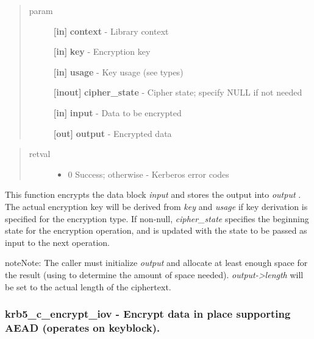 \documentclass[letterpaper,10pt,english]{sphinxmanual}
\begin{document}
\begin{quote}\begin{description}
\item[{param}] \leavevmode
\textbf{{[}in{]}} \textbf{context} - Library context

\textbf{{[}in{]}} \textbf{key} - Encryption key

\textbf{{[}in{]}} \textbf{usage} - Key usage (see  types)

\textbf{{[}inout{]}} \textbf{cipher\_state} - Cipher state; specify NULL if not needed

\textbf{{[}in{]}} \textbf{input} - Data to be encrypted

\textbf{{[}out{]}} \textbf{output} - Encrypted data

\end{description}\end{quote}
\begin{quote}\begin{description}
\item[{retval}] \leavevmode\begin{itemize}
\item {} 
0   Success; otherwise - Kerberos error codes

\end{itemize}

\end{description}\end{quote}

This function encrypts the data block \emph{input} and stores the output into \emph{output} . The actual encryption key will be derived from \emph{key} and \emph{usage} if key derivation is specified for the encryption type. If non-null, \emph{cipher\_state} specifies the beginning state for the encryption operation, and is updated with the state to be passed as input to the next operation.

\begin{notice}{note}{Note:}
The caller must initialize \emph{output} and allocate at least enough space for the result (using {\hyperref[appdev/refs/api/krb5_c_encrypt_length:krb5_c_encrypt_length]{}} to determine the amount of space needed). \emph{output-\textgreater{}length} will be set to the actual length of the ciphertext.
\end{notice}


\subsubsection{krb5\_c\_encrypt\_iov -  Encrypt data in place supporting AEAD (operates on keyblock).}
\label{appdev/refs/api/krb5_c_encrypt_iov:krb5-c-encrypt-iov-encrypt-data-in-place-supporting-aead-operates-on-keyblock}\label{appdev/refs/api/krb5_c_encrypt_iov::doc}
\end{document}
